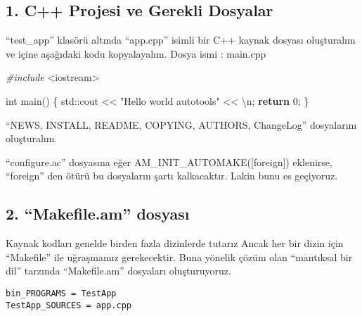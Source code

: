 \documentclass[
]{book}
\newenvironment{Shaded}{\begin{snugshade}}{\end{snugshade}}
\newcommand{\BuiltInTok}[1]{#1}
\newcommand{\CharTok}[1]{\textcolor[rgb]{0.31,0.60,0.02}{#1}}
\newcommand{\ControlFlowTok}[1]{\textcolor[rgb]{0.13,0.29,0.53}{\textbf{#1}}}
\newcommand{\DataTypeTok}[1]{\textcolor[rgb]{0.13,0.29,0.53}{#1}}
\newcommand{\DecValTok}[1]{\textcolor[rgb]{0.00,0.00,0.81}{#1}}
\newcommand{\FunctionTok}[1]{\textcolor[rgb]{0.00,0.00,0.00}{#1}}
\newcommand{\ImportTok}[1]{#1}
\newcommand{\NormalTok}[1]{#1}
\newcommand{\PreprocessorTok}[1]{\textcolor[rgb]{0.56,0.35,0.01}{\textit{#1}}}
\newcommand{\SpecialCharTok}[1]{\textcolor[rgb]{0.00,0.00,0.00}{#1}}
\newcommand{\StringTok}[1]{\textcolor[rgb]{0.31,0.60,0.02}{#1}}
\begin{document}
\hypertarget{c-projesi-ve-gerekli-dosyalar}{%
\subsection*{1. C++ Projesi ve Gerekli Dosyalar}\label{c-projesi-ve-gerekli-dosyalar}}

``test\_app'' klasörü altında ``app.cpp'' isimli bir C++ kaynak dosyası oluşturalım ve içine aşağıdaki kodu kopyalayalım.
Dosya ismi : main.cpp

\begin{Shaded}
\begin{Highlighting}[]
\PreprocessorTok{\#include }\ImportTok{<iostream>}

\DataTypeTok{int}\NormalTok{ main()}
\NormalTok{\{}
  \BuiltInTok{std::}\NormalTok{cout << }\StringTok{"Hello world autotools"}\NormalTok{ << }\CharTok{\textquotesingle{}}\SpecialCharTok{\textbackslash{}n}\CharTok{\textquotesingle{}}\NormalTok{;}
  \ControlFlowTok{return} \DecValTok{0}\NormalTok{;}
\NormalTok{\}}
\end{Highlighting}
\end{Shaded}

``NEWS, INSTALL, README, COPYING, AUTHORS, ChangeLog'' dosyalarını oluşturalım.

\begin{Shaded}
\end{Shaded}

``configure.ac'' dosyasına eğer AM\_INIT\_AUTOMAKE({[}foreign{]}) eklenirse, ``foreign'' den ötürü bu dosyaların şartı kalkacaktır. Lakin bunu es geçiyoruz.

\hypertarget{makefile.am-dosyasux131}{%
\subsection*{2. ``Makefile.am'' dosyası}\label{makefile.am-dosyasux131}}

Kaynak kodları genelde birden fazla dizinlerde tutarız Ancak her bir dizin için ``Makefile'' ile uğraşmamız gerekecektir. Buna yönelik çözüm olan ``mantıksal bir dil'' tarzında ``Makefile.am'' dosyaları oluşturuyoruz.

\begin{verbatim}
bin_PROGRAMS = TestApp
TestApp_SOURCES = app.cpp
\end{verbatim}
\end{document}
